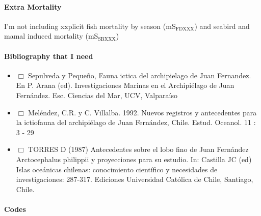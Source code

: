 \documentclass[11pt]{article}
\begin{document}
\paragraph*{Extra Mortality}
\label{sec-5-2-1-15}

     I'm not including xxplicit fish mortality by season (mS$_{\mathrm{FDXXX}}$) and seabird and mamal induced mortality (mS$_{\mathrm{SBXXX}}$)
\paragraph*{Bibliography that I need}
\label{sec-5-2-1-16}

\begin{itemize}
\item $\Box$ Sepulveda y Pequeño,  Fauna ictica del archipielago de Juan Fernandez. En P. Arana (ed). Investigaciones Marinas en el Archipiélago de Juan Fernández. Esc. Ciencias del Mar, UCV, Valparaíso
\item $\Box$ Meléndez, C.R. y C. Villalba. 1992. Nuevos registros y antecedentes para la ictiofauna del archipiélago de Juan Fernández, Chile. Estud. Oceanol. 11 : 3 - 29
\item $\Box$ TORRES D (1987) Antecedentes sobre el lobo fino de Juan Fernández Arctocephalus philippii y proyecciones para su estudio. In: Castilla JC (ed) Islas oceánicas chilenas: conocimiento científico y necesidades de investigaciones: 287-317. Ediciones Universidad Católica de Chile, Santiago, Chile.
\end{itemize}
\paragraph*{Codes}
\label{sec-5-2-1-17}
\end{document}
